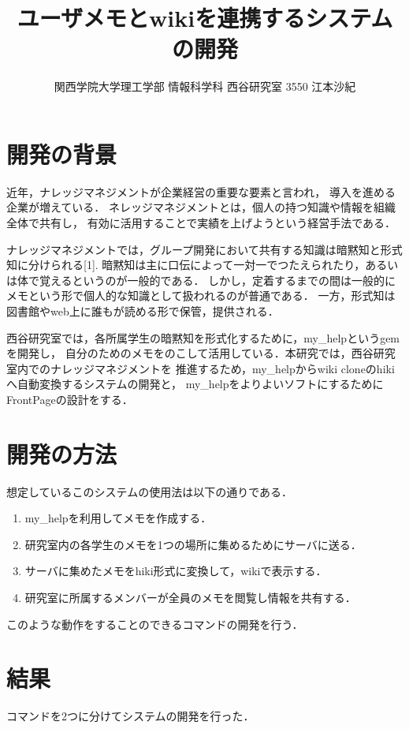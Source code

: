 \documentclass[10pt,a4j,twocolumn]{jsarticle}
\begin{document}
\title{ユーザメモとwikiを連携するシステムの開発}
\author{関西学院大学理工学部 情報科学科 西谷研究室 3550 江本沙紀}
\date{}
\maketitle
\section{開発の背景}
近年，ナレッジマネジメントが企業経営の重要な要素と言われ，
導入を進める企業が増えている．
ネレッジマネジメントとは，個人の持つ知識や情報を組織全体で共有し，
有効に活用することで実績を上げようという経営手法である．

ナレッジマネジメントでは，グループ開発において共有する知識は暗黙知と形式知に分けられる[1].
暗黙知は主に口伝によって一対一でつたえられたり，あるいは体で覚えるというのが一般的である．
しかし，定着するまでの間は一般的にメモという形で個人的な知識として扱われるのが普通である．
一方，形式知は図書館やweb上に誰もが読める形で保管，提供される．

西谷研究室では，各所属学生の暗黙知を形式化するために，my\_helpというgemを開発し，
自分のためのメモをのこして活用している．本研究では，西谷研究室内でのナレッジマネジメントを
推進するため，my\_helpからwiki cloneのhikiへ自動変換するシステムの開発と，
my\_helpをよりよいソフトにするためにFrontPageの設計をする．

\section{開発の方法}
想定しているこのシステムの使用法は以下の通りである．

\begin{enumerate}
\item my\_helpを利用してメモを作成する．
\item 研究室内の各学生のメモを1つの場所に集めるためにサーバに送る．
\item サーバに集めたメモをhiki形式に変換して，wikiで表示する．
\item 研究室に所属するメンバーが全員のメモを閲覧し情報を共有する．
\end{enumerate}
このような動作をすることのできるコマンドの開発を行う．

\section{結果}
コマンドを2つに分けてシステムの開発を行った．
\end{document}

